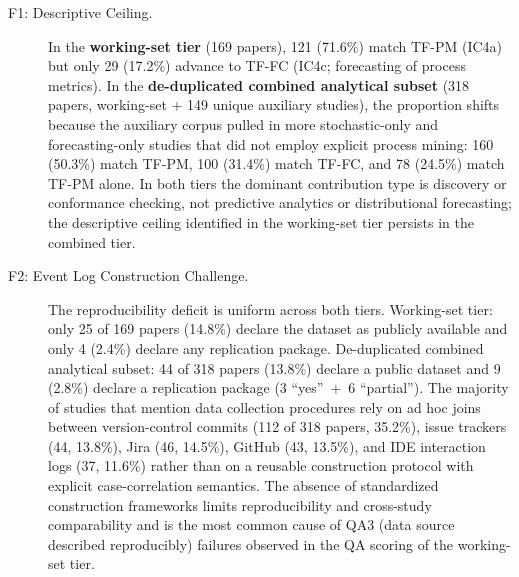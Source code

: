 \begin{description}

\item[F1: Descriptive Ceiling.]
In the \textbf{working-set tier} (169 papers), 121 (71.6\%) match TF-PM
(IC4a) but only 29 (17.2\%) advance to TF-FC (IC4c; forecasting
of process metrics). In the \textbf{de-duplicated combined analytical subset} (318 papers,
working-set + 149 unique auxiliary studies), the proportion shifts because
the auxiliary corpus pulled in more stochastic-only and forecasting-only
studies that did not employ explicit process mining: 160 (50.3\%) match TF-PM,
100 (31.4\%) match TF-FC, and 78 (24.5\%) match TF-PM alone. In both tiers the dominant contribution
type is discovery or conformance checking, not predictive analytics or
distributional forecasting; the descriptive ceiling identified in the
working-set tier persists in the combined tier.

\item[F2: Event Log Construction Challenge.]
The reproducibility deficit is uniform across both tiers. Working-set tier:
only 25 of 169 papers (14.8\%) declare the dataset as publicly available
and only 4 (2.4\%) declare any replication package. De-duplicated combined
analytical subset: 44 of
318 papers (13.8\%) declare a public dataset and 9 (2.8\%) declare a
replication package (3 ``yes''~+~6 ``partial''). The majority of studies
that mention data collection procedures rely on ad hoc joins between
version-control commits (112 of 318 papers, 35.2\%), issue trackers (44,
13.8\%), Jira (46, 14.5\%), GitHub (43, 13.5\%), and IDE interaction logs
(37, 11.6\%) rather than on a reusable construction protocol with explicit
case-correlation semantics. The absence of standardized construction
frameworks limits reproducibility and cross-study comparability and is the
most common cause of QA3 (data source described reproducibly) failures
observed in the QA scoring of the working-set tier.


\end{description}
